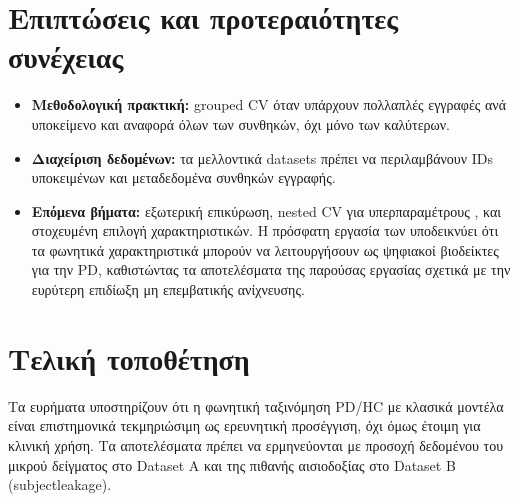 \section{Επιπτώσεις και προτεραιότητες συνέχειας}

\begin{itemize}
    \item \textbf{Μεθοδολογική πρακτική:} grouped CV όταν υπάρχουν πολλαπλές εγγραφές ανά υποκείμενο και αναφορά όλων των συνθηκών, όχι μόνο των καλύτερων.
    \item \textbf{Διαχείριση δεδομένων:} τα μελλοντικά datasets πρέπει να περιλαμβάνουν IDs υποκειμένων και μεταδεδομένα συνθηκών εγγραφής.
    \item \textbf{Επόμενα βήματα:} εξωτερική επικύρωση, nested CV για υπερπαραμέτρους \citep{varma2006nestedcv}, και στοχευμένη επιλογή χαρακτηριστικών. Η πρόσφατη εργασία των \citet{cao2025speech} υποδεικνύει ότι τα φωνητικά χαρακτηριστικά μπορούν να λειτουργήσουν ως ψηφιακοί βιοδείκτες για την PD, καθιστώντας τα αποτελέσματα της παρούσας εργασίας σχετικά με την ευρύτερη επιδίωξη μη επεμβατικής ανίχνευσης.
\end{itemize}

\section{Τελική τοποθέτηση}

Τα ευρήματα υποστηρίζουν ότι η φωνητική ταξινόμηση PD/HC με κλασικά μοντέλα είναι επιστημονικά τεκμηριώσιμη ως ερευνητική προσέγγιση, όχι όμως έτοιμη για κλινική χρήση. 
Τα αποτελέσματα πρέπει να ερμηνεύονται με προσοχή δεδομένου του μικρού δείγματος στο Dataset A και της πιθανής αισιοδοξίας στο Dataset B (\gls{subjectleakage}).
